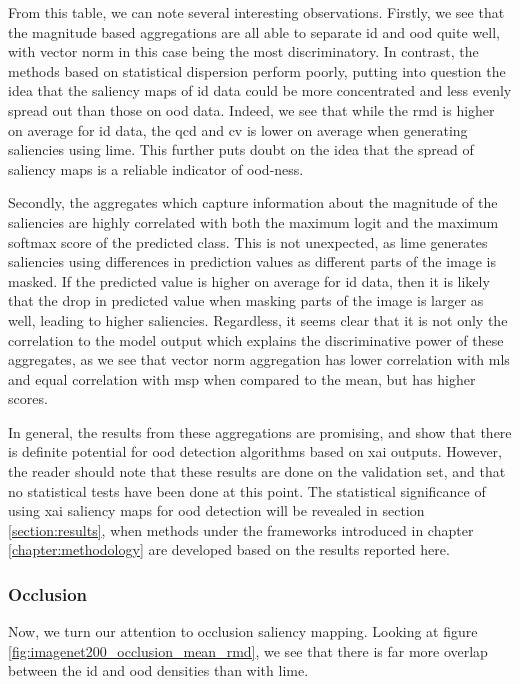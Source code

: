 \documentclass[UKenglish]{uiomasterthesis} %
\theoremstyle{definition}
\begin{document}
From this table, we can note several interesting observations. Firstly, we see that the magnitude based aggregations are all able to separate \ac{id} and \ac{ood} quite well, with vector norm in this case being the most discriminatory. In contrast, the methods based on statistical dispersion perform poorly, putting into question the idea that the saliency maps of \ac{id} data could be more concentrated and less evenly spread out than those on \ac{ood} data. Indeed, we see that while the \ac{rmd} is higher on average for \ac{id} data, the \ac{qcd} and \ac{cv} is lower on average when generating saliencies using \ac{lime}. This further puts doubt on the idea that the spread of saliency maps is a reliable indicator of \ac{ood}-ness.

Secondly, the aggregates which capture information about the magnitude of the saliencies are highly correlated with both the maximum logit and the maximum softmax score of the predicted class. This is not unexpected, as \ac{lime} generates saliencies using differences in prediction values as different parts of the image is masked. If the predicted value is higher on average for \ac{id} data, then it is likely that the drop in predicted value when masking parts of the image is larger as well, leading to higher saliencies. Regardless, it seems clear that it is not only the correlation to the model output which explains the discriminative power of these aggregates, as we see that vector norm aggregation has lower correlation with \ac{mls} and equal correlation with \ac{msp} when compared to the mean, but has higher scores.

In general, the results from these aggregations are promising, and show that there is definite potential for \ac{ood} detection algorithms based on \ac{xai} outputs. However, the reader should note that these results are done on the validation set, and that no statistical tests have been done at this point. The statistical significance of using \ac{xai} saliency maps for \ac{ood} detection will be revealed in section \ref{section:results}, when methods under the frameworks introduced in chapter \ref{chapter:methodology} are developed based on the results reported here.

\subsubsection{Occlusion}

Now, we turn our attention to occlusion saliency mapping. Looking at figure \ref{fig:imagenet200_occlusion_mean_rmd}, we see that there is far more overlap between the \ac{id} and \ac{ood} densities than with \ac{lime}.
\end{document}
